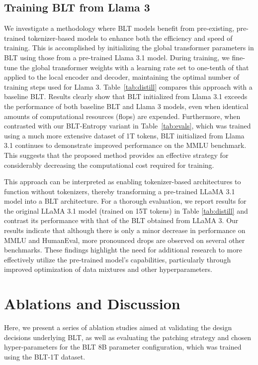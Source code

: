 \subsection{Training {\textsc BLT} from Llama 3}
\label{sec:distillation}
We investigate a methodology where {\textsc BLT} models benefit from pre-existing, pre-trained tokenizer-based models to enhance both the efficiency and speed of training. This is accomplished by initializing the global transformer parameters in {\textsc BLT} using those from a pre-trained Llama 3.1 model. During training, we fine-tune the global transformer weights with a learning rate set to one-tenth of that applied to the local encoder and decoder, maintaining the optimal number of training steps used for Llama 3. Table~\ref{tab:distill} compares this approach with a baseline {\textsc BLT}. Results clearly show that {\textsc BLT} initialized from Llama 3.1 exceeds the performance of both baseline {\textsc BLT} and Llama 3 models, even when identical amounts of computational resources (flops) are expended. Furthermore, when contrasted with our {\textsc BLT}-Entropy variant in Table~\ref{tab:evals}, which was trained using a much more extensive dataset of 1T tokens, {\textsc BLT} initialized from Llama 3.1 continues to demonstrate improved performance on the MMLU benchmark. This suggests that the proposed method provides an effective strategy for considerably decreasing the computational cost required for training.

This approach can be interpreted as enabling tokenizer-based architectures to function without tokenizers, thereby transforming a pre-trained LLaMA 3.1 model into a {\textsc BLT} architecture. For a thorough evaluation, we report results for the original LLaMA 3.1 model (trained on 15T tokens) in Table \ref{tab:distill} and contrast its performance with that of the {\textsc BLT} obtained from LLaMA 3. Our results indicate that although there is only a minor decrease in performance on MMLU and HumanEval, more pronounced drops are observed on several other benchmarks. These findings highlight the need for additional research to more effectively utilize the pre-trained model's capabilities, particularly through improved optimization of data mixtures and other hyperparameters.

\section{Ablations and Discussion}
\label{section:ablations}
Here, we present a series of ablation studies aimed at validating the design decisions underlying {\textsc BLT}, as well as evaluating the patching strategy and chosen hyper-parameters for the {\textsc BLT} 8B parameter configuration, which was trained using the {\textsc BLT}-1T dataset.

